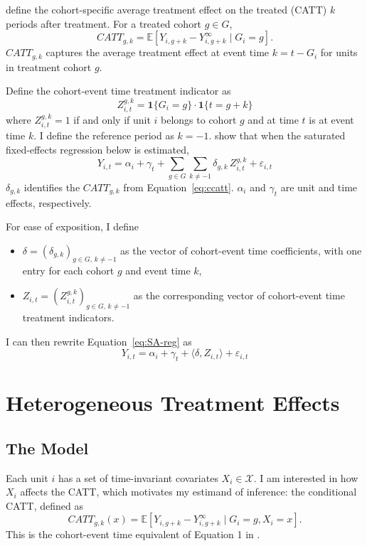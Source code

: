 \documentclass[12pt,notitlepage]{article}
\newcommand{\E}{\mathbb{E}}
\renewcommand{\eqref}[1]{Equation~\ref{#1}}
\begin{document}
\cite{sun_estimating_2021} define the cohort-specific average treatment effect on the treated (CATT) $k$ periods after treatment. 
For a treated cohort $g \in G$,
\begin{equation}\label{eq:ccatt}
    CATT_{g,k} = \E[Y_{i,g+k} - Y_{i,g+k}^\infty \mid G_i=g].
\end{equation}
$CATT_{g,k}$ captures the average treatment effect at event time $k =  t - G_i$ for units in treatment cohort $g$. 

Define the cohort-event time treatment indicator as
$$Z_{i,t}^{g,k} = \mathbf{1}\{G_i=g\}\cdot \mathbf{1}\{t=g+k\}$$
where $Z_{i,t}^{g,k} = 1$ if and only if unit $i$ belongs to cohort $g$ and at time $t$ is at event time $k$.
I define the reference period as $k=-1$. 
\cite{sun_estimating_2021} show that when the saturated fixed-effects regression below is estimated,
\begin{equation}\label{eq:SA-reg}
Y_{i,t} = \alpha_i + \gamma_t + \sum_{g \in G}\sum_{k \neq -1} \delta_{g,k}\, Z_{i,t}^{g,k} + \varepsilon_{i,t}
\end{equation}
$\delta_{g, k}$ identifies the $CATT_{g, k}$ from \eqref{eq:ccatt}.
$\alpha_i$ and $\gamma_t$ are unit and time effects, respectively.  

For ease of exposition, I define
\begin{itemize}
  \item $\delta = (\delta_{g,k})_{g \in G, \, k \neq -1}$ as the vector of cohort-event time coefficients, with one entry for each cohort $g$ and event time $k$,
  \item $Z_{i,t} = (Z_{i,t}^{g,k})_{g \in G, \, k \neq -1}$ as the corresponding vector of cohort-event time treatment indicators.
\end{itemize}
I can then rewrite \eqref{eq:SA-reg} as
\begin{equation}\label{eq:SA-reg-vec}
Y_{i,t} = \alpha_i + \gamma_t + \langle \delta, Z_{i,t} \rangle + \varepsilon_{i,t}
\end{equation}
\section{Heterogeneous Treatment Effects} \label{sec:het_te}
\subsection{The Model}
Each unit $i$ has a set of time-invariant covariates $X_i \in \mathcal{X}$.
I am interested in how $X_i$ affects the CATT, which motivates my estimand of inference: the conditional CATT, defined as 
\begin{equation}\label{eq:catt_hte}
    CATT_{g,k}(x) = \E[Y_{i,g+k} - Y_{i,g+k}^\infty \mid G_i=g, X_i=x]. 
\end{equation}
This is the cohort-event time equivalent of Equation 1 in \cite{gavrilova_difference--difference_2025}.
\end{document}
